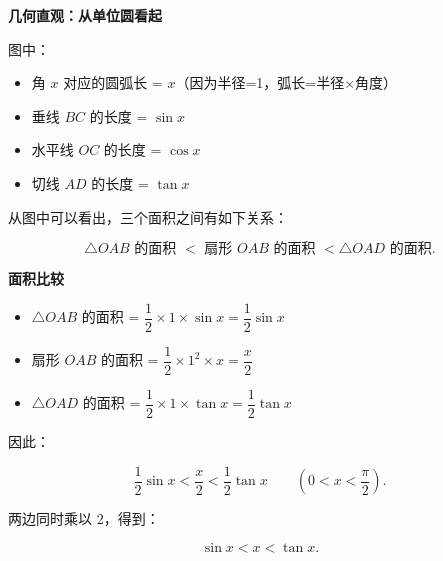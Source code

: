 \documentclass[fontset=fandol]{ctexart}
\newenvironment{custom}[1]{\par\noindent\textbf{#1}\quad}{\par\vspace{0.8em}}
\begin{document}
\begin{custom}{几何直观：从单位圆看起}
\begin{center}

\end{center}



图中：

\begin{itemize}

\item 角 \(x\) 对应的圆弧长 = \(x\)（因为半径=1，弧长=半径×角度）

\item 垂线 \(BC\) 的长度 = \(\sin x\)

\item 水平线 \(OC\) 的长度 = \(\cos x\)

\item 切线 \(AD\) 的长度 = \(\tan x\)

\end{itemize}



从图中可以看出，三个面积之间有如下关系：



\[

\triangle OAB \text{ 的面积 } < \text{ 扇形 } OAB \text{ 的面积 } < \triangle OAD \text{ 的面积}.

\]



\end{custom}



\begin{custom}{面积比较}



\begin{itemize}

\item \(\triangle OAB\) 的面积 = \(\dfrac{1}{2} \times 1 \times \sin x = \dfrac{1}{2} \sin x\)

\item 扇形 \(OAB\) 的面积 = \(\dfrac{1}{2} \times 1^2 \times x = \dfrac{x}{2}\)

\item \(\triangle OAD\) 的面积 = \(\dfrac{1}{2} \times 1 \times \tan x = \dfrac{1}{2} \tan x\)

\end{itemize}



因此：



\[

\dfrac{1}{2} \sin x  <  \dfrac{x}{2} < \dfrac{1}{2} \tan x \qquad (0 < x < \dfrac{\pi}{2}).

\]



两边同时乘以 2，得到：



\[

\sin x  < x < \tan x.

\]



\end{custom}
\end{document}
